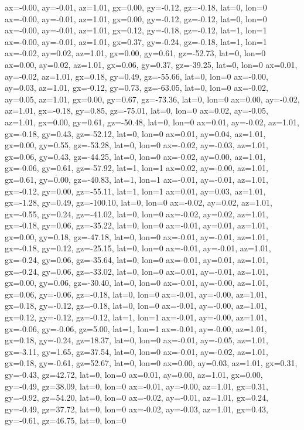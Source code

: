 ax=-0.00, ay=-0.01, az=1.01, gx=0.00, gy=-0.12, gz=-0.18, lat=0, lon=0
ax=-0.00, ay=-0.01, az=1.01, gx=0.00, gy=-0.12, gz=-0.12, lat=0, lon=0
ax=-0.00, ay=-0.01, az=1.01, gx=0.12, gy=-0.18, gz=-0.12, lat=1, lon=1
ax=-0.00, ay=-0.01, az=1.01, gx=0.37, gy=-0.24, gz=-0.18, lat=1, lon=1
ax=-0.02, ay=0.02, az=1.01, gx=0.00, gy=0.61, gz=-52.73, lat=0, lon=0
ax=0.00, ay=0.02, az=1.01, gx=0.06, gy=0.37, gz=-39.25, lat=0, lon=0
ax=0.01, ay=-0.02, az=1.01, gx=0.18, gy=0.49, gz=-55.66, lat=0, lon=0
ax=-0.00, ay=0.03, az=1.01, gx=-0.12, gy=0.73, gz=-63.05, lat=0, lon=0
ax=-0.02, ay=0.05, az=1.01, gx=0.00, gy=0.67, gz=-73.36, lat=0, lon=0
ax=0.00, ay=-0.02, az=1.01, gx=-0.18, gy=0.85, gz=-75.01, lat=0, lon=0
ax=0.02, ay=-0.05, az=1.01, gx=0.00, gy=0.61, gz=-50.48, lat=0, lon=0
ax=0.01, ay=-0.02, az=1.01, gx=-0.18, gy=0.43, gz=-52.12, lat=0, lon=0
ax=0.01, ay=0.04, az=1.01, gx=0.00, gy=0.55, gz=-53.28, lat=0, lon=0
ax=-0.02, ay=-0.03, az=1.01, gx=0.06, gy=0.43, gz=-44.25, lat=0, lon=0
ax=-0.02, ay=0.00, az=1.01, gx=-0.06, gy=0.61, gz=-57.92, lat=1, lon=1
ax=0.02, ay=-0.00, az=1.01, gx=0.61, gy=0.00, gz=-40.83, lat=1, lon=1
ax=-0.01, ay=-0.01, az=1.01, gx=-0.12, gy=0.00, gz=-55.11, lat=1, lon=1
ax=0.01, ay=0.03, az=1.01, gx=-1.28, gy=0.49, gz=-100.10, lat=0, lon=0
ax=-0.02, ay=0.02, az=1.01, gx=-0.55, gy=0.24, gz=-41.02, lat=0, lon=0
ax=-0.02, ay=0.02, az=1.01, gx=-0.18, gy=0.06, gz=-35.22, lat=0, lon=0
ax=-0.01, ay=0.01, az=1.01, gx=0.00, gy=0.18, gz=-47.18, lat=0, lon=0
ax=-0.01, ay=-0.01, az=1.01, gx=-0.18, gy=0.12, gz=-25.15, lat=0, lon=0
ax=-0.01, ay=-0.01, az=1.01, gx=-0.24, gy=0.06, gz=-35.64, lat=0, lon=0
ax=-0.01, ay=0.01, az=1.01, gx=-0.24, gy=0.06, gz=-33.02, lat=0, lon=0
ax=0.01, ay=-0.01, az=1.01, gx=0.00, gy=0.06, gz=-30.40, lat=0, lon=0
ax=-0.01, ay=-0.00, az=1.01, gx=0.06, gy=-0.06, gz=-0.18, lat=0, lon=0
ax=-0.01, ay=-0.00, az=1.01, gx=0.18, gy=-0.12, gz=-0.18, lat=0, lon=0
ax=-0.01, ay=-0.00, az=1.01, gx=0.12, gy=-0.12, gz=-0.12, lat=1, lon=1
ax=-0.01, ay=-0.00, az=1.01, gx=-0.06, gy=-0.06, gz=5.00, lat=1, lon=1
ax=-0.01, ay=-0.00, az=1.01, gx=0.18, gy=-0.24, gz=18.37, lat=0, lon=0
ax=-0.01, ay=-0.05, az=1.01, gx=-3.11, gy=1.65, gz=37.54, lat=0, lon=0
ax=-0.01, ay=-0.02, az=1.01, gx=0.18, gy=-0.61, gz=52.67, lat=0, lon=0
ax=0.00, ay=0.03, az=1.01, gx=0.31, gy=-0.43, gz=42.72, lat=0, lon=0
ax=0.01, ay=0.00, az=1.01, gx=0.00, gy=-0.49, gz=38.09, lat=0, lon=0
ax=-0.01, ay=-0.00, az=1.01, gx=0.31, gy=-0.92, gz=54.20, lat=0, lon=0
ax=-0.02, ay=-0.01, az=1.01, gx=0.24, gy=-0.49, gz=37.72, lat=0, lon=0
ax=-0.02, ay=-0.03, az=1.01, gx=0.43, gy=-0.61, gz=46.75, lat=0, lon=0
